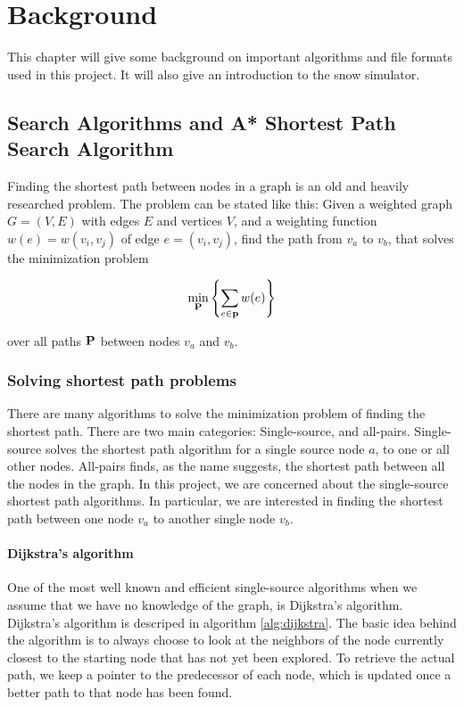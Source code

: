\chapter{Background}
This chapter will give some background on important algorithms and file formats used in this project. It will also give an introduction to the snow simulator.

\section{Search Algorithms and A* Shortest Path Search Algorithm}
Finding the shortest path between nodes in a graph is an old and heavily researched problem. The problem can be stated like this: Given a weighted graph $G = (V,E)$ with edges $E$ and vertices $V$, and a weighting function $w(e) = w(v_i, v_j)$ of edge $e = (v_i, v_j)$, find the path from $v_a$ to $v_b$, that solves the minimization problem

\begin{equation}
\min_{\mathbf P} \left\{ \sum_{e\in \mathbf{p}} w(e) \right\}
\end{equation}

over all paths $\mathbf P$ between nodes $v_a$ and $v_b$.

\subsection{Solving shortest path problems}
There are many algorithms to solve the minimization problem of finding the shortest path. There are two main categories: Single-source, and all-pairs. Single-source solves the shortest path algorithm for a single source node $a$, to one or all other nodes. All-pairs finds, as the name suggests, the shortest path between all the nodes in the graph. In this project, we are concerned about the single-source shortest path algorithms. In particular, we are interested in finding the shortest path between one node $v_a$ to another single node $v_b$.

\subsubsection{Dijkstra's algorithm}
One of the most well known and efficient single-source algorithms when we assume that we have no knowledge of the graph, is Dijkstra's algorithm. Dijkstra's algorithm is descriped in algorithm \ref{alg:dijkstra}. The basic idea behind the algorithm is to always choose to look at the neighbors of the node currently closest to the starting node that has not yet been explored. To retrieve the actual path, we keep a pointer to the predecessor of each node, which is updated once a better path to that node has been found. 

